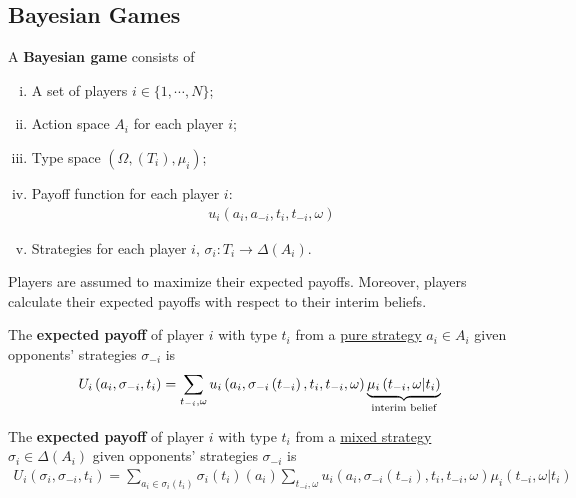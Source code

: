 \documentclass{article}
\begin{document}
   	\subsection{Bayesian Games}
   	\begin{definition}
   		A \textbf{Bayesian game} consists of
   		\begin{enumerate}[(i)]
   			\item A set of players $i \in \{1, \cdots, N\}$;
   			\item Action space $A_i$ for each player $i$;
   			\item Type space $(\Omega, (T_i), \mu_i)$;
   			\item Payoff function for each player $i$:
   			\begin{align}
   				u_{i}\left(a_{i}, a_{-i}, t_{i}, t_{-i}, \omega\right)
   			\end{align}
   			\item Strategies for each player $i$, $\sigma_i: T_i \to \Delta (A_i)$.
   		\end{enumerate}
   	\end{definition}
   	
   	\begin{assumption}
   		Players are assumed to maximize their expected payoffs. Moreover, players calculate their expected payoffs with respect to their interim beliefs.
   	\end{assumption}
   	
   	\begin{definition}
   		The \textbf{expected payoff} of player $i$ with type $t_i$ from a \ul{pure strategy} $a_i \in A_i$ given opponents' strategies $\sigma_{-i}$ is
   		\begin{align}
   			U_{i}\left(a_{i}, \sigma_{-i}, t_{i}\right)=\sum_{t_{-i}, \omega} u_{i}\left(a_{i}, \sigma_{-i}\left(t_{-i}\right), t_{i}, t_{-i}, \omega\right) \underbrace{\mu_{i}\left(t_{-i}, \omega | t_{i}\right)}_{\text{{interim belief}}}
   		\end{align}
   	\end{definition}

   	\begin{definition}[Generalization]
   		The \textbf{expected payoff} of player $i$ with type $t_i$ from a \ul{mixed strategy} $\sigma_i \in \Delta(A_i)$ given opponents' strategies $\sigma_{-i}$ is
   		\begin{align}
   			U_{i}\left(\sigma_{i}, \sigma_{-i}, t_{i}\right)
   			=\sum_{a_i \in \sigma_i(t_i)}
   			\sigma_i(t_i)(a_i) \sum_{t_{-i}, \omega} u_{i}\left(a_{i}, \sigma_{-i}\left(t_{-i}\right), t_{i}, t_{-i}, \omega\right) \mu_{i}\left(t_{-i}, \omega | t_{i}\right)
   		\end{align}
   	\end{definition}
   	
\end{document}
